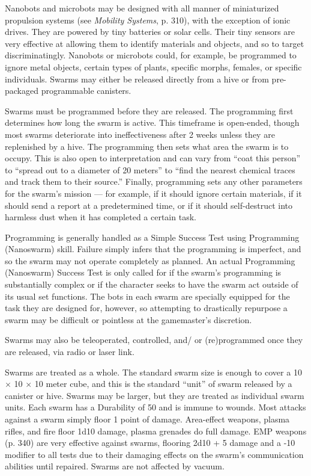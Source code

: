 {{Nanobots and microbots may be designed with all manner of miniaturized propulsion systems (see \emph{Mobility Systems}, p. 310), with the exception of ionic drives. They are powered by tiny batteries or solar cells. Their tiny sensors are very effective at allowing them to identify materials and objects, and so to target discriminatingly. Nanobots or microbots could, for example, be programmed to ignore metal objects, certain types of plants, specific morphs, females, or specific individuals. Swarms may either be released directly from a hive or from pre-packaged programmable canisters. 

Swarms must be programmed before they are released. The programming first determines how long the swarm is active. This timeframe is open-ended, though most swarms deteriorate into ineffectiveness after 2 weeks unless they are replenished by a hive. The programming then sets what area the swarm is to occupy. This is also open to interpretation and can vary from ``coat this person'' to ``spread out to a diameter of 20 meters'' to ``find the nearest chemical traces and track them to their source.'' Finally, programming sets any other parameters for the swarm’s mission --- for example, if it should ignore certain materials, if it should send a report at a predetermined time, or if it should self-destruct into harmless dust when it has completed a certain task. 

Programming is generally handled as a Simple Success Test using Programming (Nanoswarm) skill. Failure simply infers that the programming is imperfect, and so the swarm may not operate completely as planned. An actual Programming (Nanoswarm) Success Test is only called for if the swarm’s programming is substantially complex or if the character seeks to have the swarm act outside of its usual set functions. The bots in each swarm are specially equipped for the task they are designed for, however, so attempting to drastically repurpose a swarm may be difficult or pointless at the gamemaster’s discretion. 

Swarms may also be teleoperated, controlled, and/ or (re)programmed once they are released, via radio or laser link. 

Swarms are treated as a whole. The standard swarm size is enough to cover a 10 $\times$ 10 $\times$ 10 meter cube, and this is the standard ``unit'' of swarm released by a canister or hive. Swarms may be larger, but they are treated as individual swarm units. Each swarm has a Durability of 50 and is immune to wounds. Most attacks against a swarm simply floor 1 point of damage. Area-effect weapons, plasma rifles, and fire floor 1d10 damage, plasma grenades do full damage. EMP weapons (p. 340) are very effective against swarms, flooring 2d10 + 5 damage and a -10 modifier to all tests due to their damaging effects on the swarm’s communication abilities until repaired. Swarms are not affected by vacuum. 

}}

